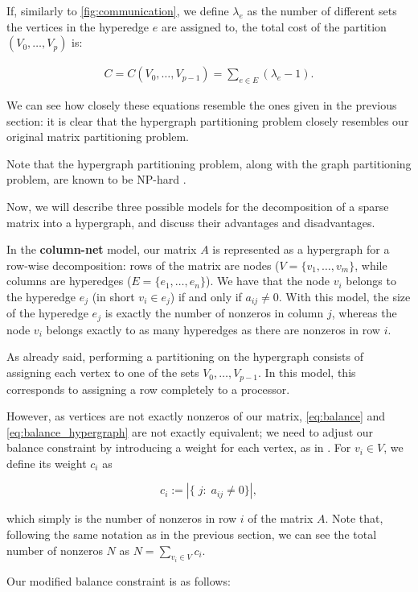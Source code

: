 If, similarly to \eqref{fig:communication}, we define $\lambda_e$ as the number of different sets the vertices in the hyperedge $e$ are assigned to, the total cost of the partition $(V_0,\dots,V_p)$ is:

\begin{align}
	C = C(V_0,\dots,V_{p-1}) = \sum_{e \in E} (\lambda_e -1).
	\label{eq:cost_hypergraph}
\end{align}

We can see how closely these equations resemble the ones given in the previous section: it is clear that the hypergraph partitioning problem closely resembles our original matrix partitioning problem.

Note that the hypergraph partitioning problem, along with the graph partitioning problem, are known to be NP-hard \cite[Ch.~6]{lengauer}. 

Now, we will describe three possible models for the decomposition of a sparse matrix into a hypergraph, and discuss their advantages and disadvantages.

In the \textbf{column-net} model, our matrix $A$ is represented as a hypergraph for a row-wise decomposition: rows of the matrix are nodes ($V=\{v_1,\dots,v_m\}$, while columns are hyperedges ($E= \{e_1,\dots,e_n\}$). We have that the node $v_i$ belongs to the hyperedge $e_j$ (in short $v_i \in e_j$) if and only if $a_{ij} \neq 0$. With this model, the size of the hyperedge $e_j$ is exactly the number of nonzeros in column $j$, whereas the node $v_i$ belongs exactly to as many hyperedges as there are nonzeros in row $i$.

As already said, performing a partitioning on the hypergraph consists of assigning each vertex to one of the sets $V_0,\dots,V_{p-1}$. In this model, this corresponds to assigning a row completely to a processor. 

However, as vertices are not exactly nonzeros of our matrix, \eqref{eq:balance} and \eqref{eq:balance_hypergraph} are not exactly equivalent; we need to adjust our balance constraint by introducing a weight for each vertex, as in \cite[Def.~4.34]{BSP}. For $v_i \in V$, we define its weight $c_i$ as

\[
	c_i := |\{\;j : \;a_{ij} \neq 0\}|,
\]

which simply is the number of nonzeros in row $i$ of the matrix $A$. Note that, following the same notation as in the previous section, we can see the total number of nonzeros $N$ as $N = \sum_{v_i \in V} c_i$.

Our modified balance constraint is as follows:

